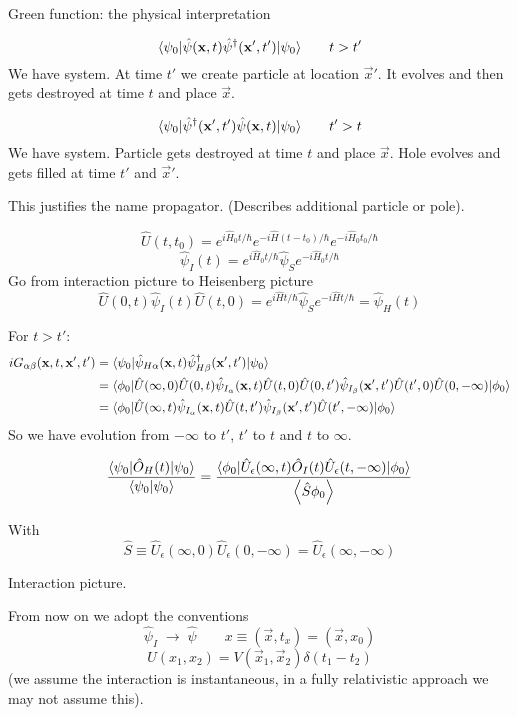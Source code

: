 \begin{note}
Green function: the physical interpretation

\[\braket[\hat{\psi}(\vec{x},t)\hat{\psi}^\dagger(\vec{x}', t')]{\psi_0}{\psi_0} \qquad t> t'\]
We have system. At time $t'$ we create particle at location $\vec{x}'$. It evolves and then gets destroyed at time $t$ and place $\vec{x}$.

\[\braket[\hat{\psi}^\dagger(\vec{x}',t')\hat{\psi}(\vec{x}, t)]{\psi_0}{\psi_0} \qquad t'> t\]
We have system. Particle gets destroyed at time $t$ and place $\vec{x}$. Hole evolves and gets filled at time $t'$ and $\vec{x}'$.


This justifies the name propagator. (Describes additional particle or pole).

\end{note}

\[ \hat{U}(t,t_0) = e^{i\hat{H}_0t/\hbar}e^{-i\hat{H}(t-t_0)/\hbar}e^{-i\hat{H}_0t_0/\hbar} \]
\[\hat{\psi}_I(t) = e^{i\hat{H}_0t/\hbar}\hat{\psi}_S e^{-i\hat{H}_0t/\hbar}\]
Go from interaction picture to Heisenberg picture
\[\hat{U}(0,t)\hat{\psi}_I(t)\hat{U}(t,0) = e^{i\hat{H}t/\hbar}\hat{\psi}_S e^{-i\hat{H}t/\hbar} = \hat{\psi}_H(t)\]

For $t>t'$: 
\begin{align*}
iG_{\alpha\beta}(\vec{x},t,\vec{x}',t') &= \braket[\hat{\psi}_{H\alpha}(\vec{x},t)\hat{\psi}^\dagger_{H\beta}(\vec{x}',t')]{\psi_0}{\psi_0} \\
&= \braket[\hat{U}(\infty,0)\hat{U}(0,t)\hat{\psi}_{I_\alpha}(\vec{x},t)\hat{U}(t,0)\hat{U}(0,t')\hat{\psi}_{I_\beta}(\vec{x}',t')\hat{U}(t',0)\hat{U}(0,-\infty)]{\phi_0}{\phi_0} \\
&= \braket[\hat{U}(\infty,t)\hat{\psi}_{I_\alpha}(\vec{x},t)\hat{U}(t,t')\hat{\psi}_{I_\beta}(\vec{x}',t')\hat{U}(t',-\infty)]{\phi_0}{\phi_0}
\end{align*}
So we have evolution from $-\infty$ to $t'$, $t'$ to $t$ and $t$ to $\infty$.

\[ \frac{\braket[\hat{O}_H(t)]{\psi_0}{\psi_0}}{\braket{\psi_0}{\psi_0}} = \frac{\braket[\hat{U}_\epsilon(\infty,t)\hat{O}_I(t)\hat{U}_\epsilon(t,-\infty)]{\phi_0}{\phi_0}}{\expval{\hat{S}{\phi_0}}} \]

With
\[ \hat{S} \equiv \hat{U}_\epsilon(\infty,0)\hat{U}_\epsilon(0,-\infty) = \hat{U}_\epsilon(\infty,-\infty) \]

Interaction picture.

From now on we adopt the conventions
\[ \hat{\psi}_I \; \to \; \hat{\psi} \qquad x \equiv (\vec{x},t_x) = (\vec{x}, x_0) \]
\[ U(x_1,x_2) = V(\vec{x}_1, \vec{x}_2)\delta(t_1-t_2) \]
(we assume the interaction is instantaneous, in a fully relativistic approach we may not assume this).

